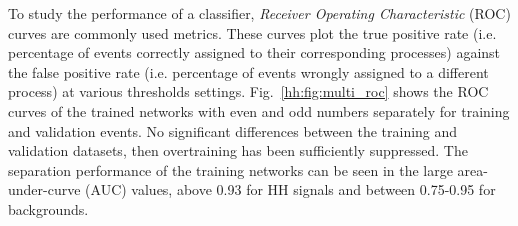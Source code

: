 \documentclass[../main.tex]{subfiles}
\begin{document}
To study the performance of a classifier, \textit{Receiver Operating Characteristic} (ROC) curves are commonly used metrics. These curves plot the true positive rate (i.e. percentage of events correctly assigned to their corresponding processes) against the false positive rate (i.e. percentage of events wrongly assigned to a different process) at various thresholds settings. Fig.~\ref{hh:fig:multi_roc} shows the ROC curves of the trained networks with even and odd numbers separately for training and validation events. No significant differences between the training and validation datasets, then overtraining has been sufficiently suppressed. The separation performance of the training networks can be seen in the large area-under-curve (AUC) values, above 0.93 for HH signals and between 0.75-0.95 for backgrounds.

\begin{figure}[h!]
\begin{center}
 \\

\end{center}
\end{figure}
\end{document}
